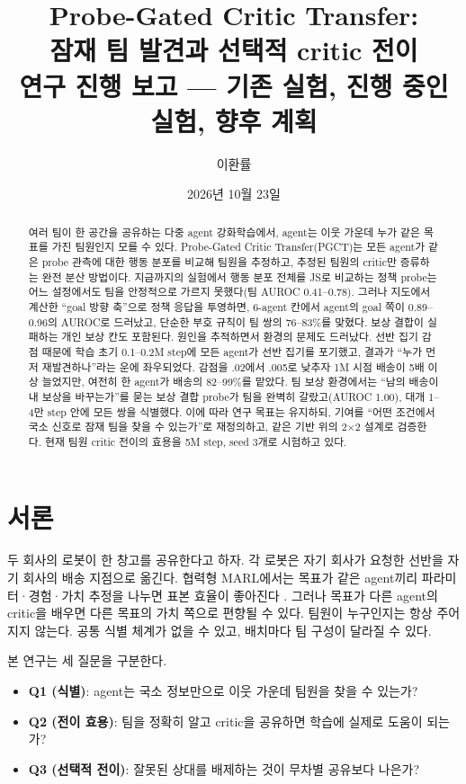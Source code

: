 \documentclass[10pt]{article}
\title{Probe-Gated Critic Transfer:\\ 잠재 팀 발견과 선택적 critic 전이\\[4pt] \large 연구 진행 보고 --- 기존 실험, 진행 중인 실험, 향후 계획}
\author{이환률}
\date{2026년 10월 23일}
\begin{document}
\maketitle

\begin{abstract}
여러 팀이 한 공간을 공유하는 다중 agent 강화학습에서, agent는 이웃 가운데 누가 같은 목표를 가진 팀원인지 모를 수 있다.
Probe-Gated Critic Transfer(PGCT)는 모든 agent가 같은 probe 관측에 대한 행동 분포를 비교해 팀원을 추정하고, 추정된 팀원의 critic만 증류하는 완전 분산 방법이다.
지금까지의 실험에서 행동 분포 전체를 JS로 비교하는 정책 probe는 어느 설정에서도 팀을 안정적으로 가르지 못했다(팀 AUROC 0.41--0.78).
그러나 지도에서 계산한 ``goal 방향 축''으로 정책 응답을 투영하면, 6-agent 칸에서 agent의 goal 쪽이 0.89--0.96의 AUROC로 드러났고, 단순한 부호 규칙이 팀 쌍의 76--83\%를 맞혔다. 보상 결합이 실패하는 개인 보상 칸도 포함된다.
원인을 추적하면서 환경의 문제도 드러났다. 선반 집기 감점 때문에 학습 초기 0.1--0.2M step에 모든 agent가 선반 집기를 포기했고, 결과가 ``누가 먼저 재발견하나''라는 운에 좌우되었다.
감점을 .02에서 .005로 낮추자 1M 시점 배송이 5배 이상 늘었지만, 여전히 한 agent가 배송의 82--99\%를 맡았다.
팀 보상 환경에서는 ``남의 배송이 내 보상을 바꾸는가''를 묻는 보상 결합 probe가 팀을 완벽히 갈랐고(AUROC 1.00), 대개 1--4만 step 안에 모든 쌍을 식별했다.
이에 따라 연구 목표는 유지하되, 기여를 ``어떤 조건에서 국소 신호로 잠재 팀을 찾을 수 있는가''로 재정의하고, 같은 기반 위의 2$\times$2 설계로 검증한다.
현재 팀원 critic 전이의 효용을 5M step, seed 3개로 시험하고 있다.
\end{abstract}

\tableofcontents

\section{서론}

두 회사의 로봇이 한 창고를 공유한다고 하자. 각 로봇은 자기 회사가 요청한 선반을 자기 회사의 배송 지점으로 옮긴다.
협력형 MARL에서는 목표가 같은 agent끼리 파라미터·경험·가치 추정을 나누면 표본 효율이 좋아진다 \cite{christianos2020,christianos2021}.
그러나 목표가 다른 agent의 critic을 배우면 다른 목표의 가치 쪽으로 편향될 수 있다.
팀원이 누구인지는 항상 주어지지 않는다. 공통 식별 체계가 없을 수 있고, 배치마다 팀 구성이 달라질 수 있다.

본 연구는 세 질문을 구분한다.
\begin{itemize}
  \item \textbf{Q1 (식별)}: agent는 국소 정보만으로 이웃 가운데 팀원을 찾을 수 있는가?
  \item \textbf{Q2 (전이 효용)}: 팀을 정확히 알고 critic을 공유하면 학습에 실제로 도움이 되는가?
  \item \textbf{Q3 (선택적 전이)}: 잘못된 상대를 배제하는 것이 무차별 공유보다 나은가?
\end{itemize}
\end{document}
